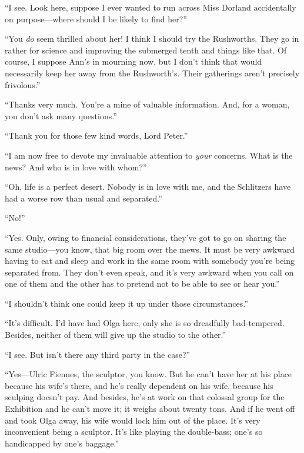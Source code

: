 \enquote{I see. Look here, suppose I ever wanted to run across Miss Dorland accidentally on purpose\allowbreak---\allowbreak where should I be likely to find her?}

\enquote{You \textit{do} seem thrilled about her! I think I should try the Rushworths. They go in rather for science and improving the submerged tenth and things like that. Of course, I suppose Ann's in mourning now, but I don't think that would necessarily keep her away from the Rushworth's. Their gatherings aren't precisely frivolous.}

\enquote{Thanks very much. You're a mine of valuable information. And, for a woman, you don't ask many questions.}

\enquote{Thank you for those few kind words, Lord Peter.}

\enquote{I am now free to devote my invaluable attention to \textit{your} concerns. What is the news? And who is in love with whom?}

\enquote{Oh, life is a perfect desert. Nobody is in love with me, and the Schlitzers have had a worse row than usual and separated.}

\enquote{No!}

\enquote{Yes. Only, owing to financial considerations, they've got to go on sharing the same studio\allowbreak---\allowbreak you know, that big room over the mews. It must be very awkward having to eat and sleep and work in the same room with somebody you're being separated from. They don't even speak, and it's very awkward when you call on one of them and the other has to pretend not to be able to see or hear you.}

\enquote{I shouldn't think one could keep it up under those circumstances.}

\enquote{It's difficult. I'd have had Olga here, only she is so dreadfully bad-tempered. Besides, neither of them will give up the studio to the other.}

\enquote{I see. But isn't there any third party in the case?}

\enquote{Yes\allowbreak---\allowbreak Ulric Fiennes, the sculptor, you know. But he can't have her at his place because his wife's there, and he's really dependent on his wife, because his sculping doesn't pay. And besides, he's at work on that colossal group for the Exhibition and he can't move it; it weighs about twenty tons. And if he went off and took Olga away, his wife would lock him out of the place. It's very inconvenient being a sculptor. It's like playing the double-bass; one's so handicapped by one's baggage.}


